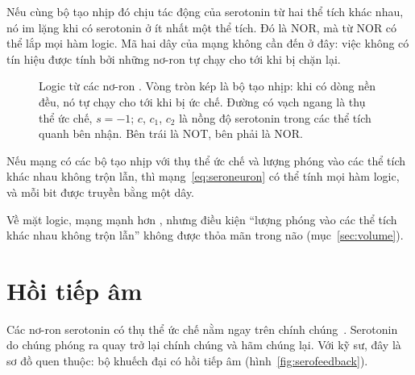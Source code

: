Nếu cùng bộ tạo nhịp đó chịu tác động của serotonin từ hai thể tích khác nhau, nó im lặng khi có serotonin ở ít nhất một thể tích. Đó là NOR, mà từ NOR có thể lắp mọi hàm logic. Mã hai dây của mạng  không cần đến ở đây: việc không có tín hiệu được tính bởi những nơ-ron tự chạy cho tới khi bị chặn lại.

\begin{figure}[t]
\centering
{}
\caption{Logic từ các nơ-ron . Vòng tròn kép là bộ tạo nhịp: khi có dòng nền đều, nó tự chạy cho tới khi bị ức chế. Đường có vạch ngang là thụ thể ức chế, $s=-1$; $c$, $c_1$, $c_2$ là nồng độ serotonin trong các thể tích quanh bên nhận. Bên trái là NOT, bên phải là NOR.}
\label{fig:serogates}
\end{figure}

\begin{keyblock}
\begin{proposition}
\label{prop:serocomplete}
Nếu mạng có các bộ tạo nhịp với thụ thể ức chế và lượng phóng vào các thể tích khác nhau không trộn lẫn, thì mạng~\eqref{eq:seroneuron} có thể tính mọi hàm logic, và mỗi bit được truyền bằng một dây.
\end{proposition}
\end{keyblock}

Về mặt logic, mạng  mạnh hơn , nhưng điều kiện ``lượng phóng vào các thể tích khác nhau không trộn lẫn'' không được thỏa mãn trong não (mục~\ref{sec:volume}).

\section{Hồi tiếp âm}

Các nơ-ron serotonin có thụ thể ức chế nằm ngay trên chính chúng~\cite{Sprouse1987}. Serotonin do chúng phóng ra quay trở lại chính chúng và hãm chúng lại. Với kỹ sư, đây là sơ đồ quen thuộc: bộ khuếch đại có hồi tiếp âm (hình~\ref{fig:serofeedback}).

